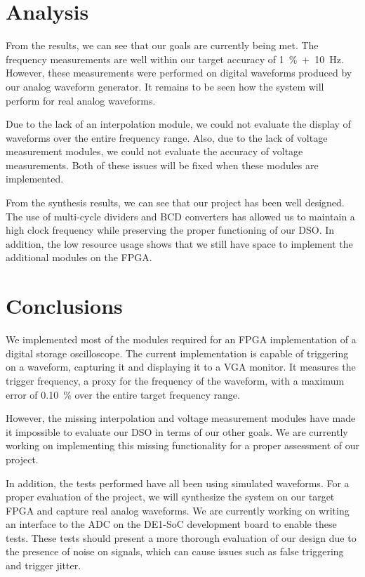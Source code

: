 \documentclass[journal]{IEEEtran}
\begin{document}
\section{Analysis}

From the results, we can see that our goals are currently being met. The frequency measurements are well within our target accuracy of 1~\%~+~10~Hz. However, these measurements were performed on digital waveforms produced by our analog waveform generator. It remains to be seen how the system will perform for real analog waveforms.

Due to the lack of an interpolation module, we could not evaluate the display of waveforms over the entire frequency range.
Also, due to the lack of voltage measurement modules, we could not evaluate the accuracy of voltage measurements.
Both of these issues will be fixed when these modules are implemented.

From the synthesis results, we can see that our project has been well designed. The use of multi-cycle dividers and BCD converters has allowed us to maintain a high clock frequency while preserving the proper functioning of our DSO. In addition, the low resource usage shows that we still have space to implement the additional modules on the FPGA.

\section{Conclusions}

We implemented most of the modules required for an FPGA implementation of a digital storage oscilloscope. The current implementation is capable of triggering on a waveform, capturing it and displaying it to a VGA monitor. It measures the trigger frequency, a proxy for the frequency of the waveform, with a maximum error of 0.10~\% over the entire target frequency range.

However, the missing interpolation and voltage measurement modules have made it impossible to evaluate our DSO in terms of our other goals. We are currently working on implementing this missing functionality for a proper assessment of our project.

In addition, the tests performed have all been using simulated waveforms. For a proper evaluation of the project, we will synthesize the system on our target FPGA and capture real analog waveforms. We are currently working on writing an interface to the ADC on the DE1-SoC development board to enable these tests. These tests should present a more thorough evaluation of our design due to the presence of noise on signals, which can cause issues such as false triggering and trigger jitter.



\end{document}
